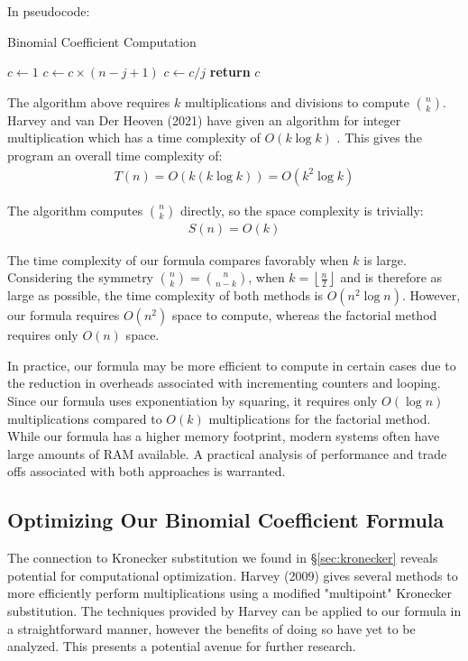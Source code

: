 \documentclass{article}
\theoremstyle{plain}
\theoremstyle{definition}
\begin{document}
In pseudocode:
\begin{algorithm}[H]
\caption{Binomial Coefficient Computation}
\begin{algorithmic}[1]
    \State \( c \leftarrow 1 \)
        \State \( c \leftarrow c \times (n - j + 1) \)
        \State \( c \leftarrow c / j \)
    \EndFor
    \State \textbf{return} \( c \)
\EndFunction
\end{algorithmic}
\end{algorithm}

The algorithm above requires $k$ multiplications and divisions to compute $\binom{n}{k}$. Harvey and van Der Heoven (2021) have given an algorithm for integer multiplication which has a time complexity of $O(k \log{k})$ \cite{harveyvanderhoeven2021}. This gives the program an overall time complexity of:
\begin{align}
    T(n) = O(k (k \log{k})) = O(k^2 \log{k})
\end{align}

The algorithm computes $\binom{n}{k}$ directly, so the space complexity is trivially:
\begin{align}
    S(n) = O(k)
\end{align}

The time complexity of our formula compares favorably when $k$ is large. Considering the symmetry $\binom{n}{k} = \binom{n}{n-k}$, when $k = \left\lfloor \frac{n}{2} \right\rfloor$ and is therefore as large as possible, the time complexity of both methods is $O(n^2 \log{n})$. However, our formula requires $O(n^2)$ space to compute, whereas the factorial method requires only $O(n)$ space.

In practice, our formula may be more efficient to compute in certain cases due to the reduction in overheads associated with incrementing counters and looping. Since our formula uses exponentiation by squaring, it requires only $O(\log{n})$ multiplications compared to $O(k)$ multiplications for the factorial method. While our formula has a higher memory footprint, modern systems often have large amounts of RAM available. A practical analysis of performance and trade offs associated with both approaches is warranted.

\subsection{Optimizing Our Binomial Coefficient Formula}
The connection to Kronecker substitution we found in \S \ref{sec:kronecker} reveals potential for computational optimization. Harvey (2009) \cite{harvey2009kronecker} gives several methods to more efficiently perform multiplications using a modified "multipoint" Kronecker substitution. The techniques provided by Harvey can be applied to our formula in a straightforward manner, however the benefits of doing so have yet to be analyzed. This presents a potential avenue for further research.
\end{document}
